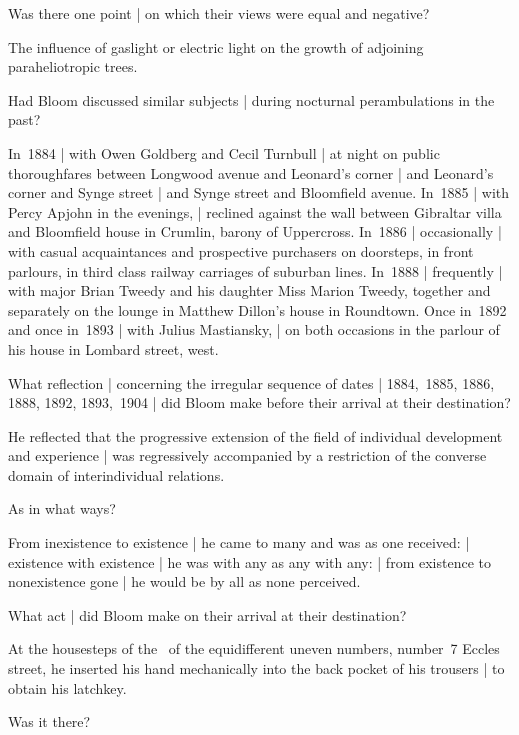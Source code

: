 Was there one point |
on which their views were equal and negative?

\Science
The influence of gaslight or electric light
on the growth of adjoining paraheliotropic trees.


Had Bloom discussed similar subjects |
during nocturnal perambulations in the past?

\Places
In~1884 |
with Owen Goldberg and Cecil Turnbull |
at night on public thoroughfares
between Longwood avenue and Leonard's corner |
and Leonard's corner and Synge street |
and Synge street and Bloomfield avenue.
In~1885 |
with Percy Apjohn in the evenings, |
reclined against the wall
between Gibraltar villa and Bloomfield house in Crumlin,
barony of Uppercross.
In~1886 |
occasionally |
with casual acquaintances and prospective purchasers on doorsteps,
in front parlours, in third class railway carriages of suburban lines.
In~1888 |
frequently |
with major Brian Tweedy and his daughter Miss Marion Tweedy,
together and separately on the lounge in Matthew Dillon's house in Roundtown.
Once in~1892 and once in~1893 |
with Julius
Mastiansky, |
on both occasions in the parlour of his
house in Lombard street, west.


What reflection |
concerning the irregular sequence of dates |
1884,~1885, 1886, 1888, 1892, 1893,~1904 |
did Bloom make before their arrival at their destination?

\Philosophy
He reflected that the progressive extension
of the field of individual development and experience |
was regressively accompanied by a restriction of
the converse domain of interindividual relations.


As in what ways?

\Religious
From inexistence to existence |
he came to many and was as one received: |
existence with existence |
he was with any as any with any: |
from existence to nonexistence gone |
he would be by all as none perceived.


What act |
did Bloom make on their arrival at their destination?

\Factual
At the housesteps of the ~of the equidifferent uneven numbers,
number~7 Eccles street,
he inserted his hand mechanically
into the back pocket of his trousers |
to obtain his latchkey.


Was it there?

